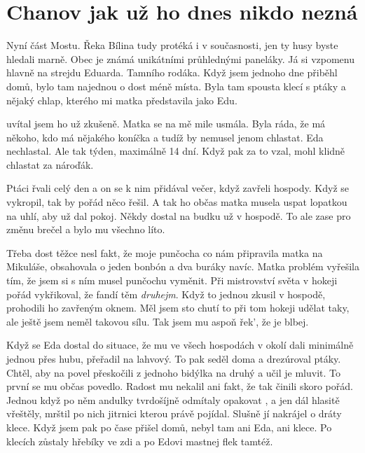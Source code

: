 
\chapter{Chanov jak už ho dnes nikdo nezná}

Nyní část Mostu. Řeka Bílina tudy protéká i v současnosti, jen ty husy byste
hledali marně. Obec je známá unikátními průhlednými paneláky. Já si vzpomenu
hlavně na strejdu Eduarda. Tamního rodáka. Když jsem jednoho dne přiběhl domů,
bylo tam najednou o dost méně místa. Byla tam spousta klecí s ptáky a nějaký
chlap, kterého mi matka představila jako Edu.

 uvítal jsem ho už zkušeně. Matka se na mě mile usmála. Byla
ráda, že má někoho, kdo má nějakého koníčka a tudíž by nemusel jenom chlastat.
Eda nechlastal. Ale tak týden, maximálně 14 dní. Když pak za to vzal, mohl
klidně chlastat za nároďák.

Ptáci řvali celý den a on se k nim přidával večer, když zavřeli hospody. Když
se vykropil, tak by pořád něco řešil. A tak ho občas matka musela uspat
lopatkou na uhlí, aby už dal pokoj. Někdy dostal na budku už v hospodě. To ale
zase pro změnu brečel a bylo mu všechno líto.

Třeba dost těžce nesl fakt, že moje punčocha co nám připravila matka na
Mikuláše, obsahovala o jeden bonbón a dva buráky navíc. Matka problém vyřešila
tím, že jsem si s ním musel punčochu vyměnit. Při mistrovství světa v hokeji
pořád vykřikoval, že fandí těm {\em druhejm}. Když to jednou zkusil v hospodě,
prohodili ho zavřeným oknem. Měl jsem sto chutí to při tom hokeji udělat taky,
ale ještě jsem neměl takovou sílu. Tak jsem mu aspoň řek', že je blbej.

Když se Eda dostal do situace, že mu ve všech hospodách v okolí dali minimálně
jednou přes hubu, přeřadil na lahvový. To pak seděl doma a drezúroval ptáky.
Chtěl, aby na povel přeskočili z jednoho bidýlka na druhý a učil je mluvit. To
první se mu občas povedlo. Radost mu nekalil ani fakt, že tak činili skoro
pořád. Jednou když po něm andulky tvrdošíjně odmítaly opakovat , a
jen dál hlasitě vřeštěly, mrštil po nich jitrnici kterou právě pojídal. Slušně
jí nakrájel o dráty klece. Když jsem pak po čase přišel domů, nebyl tam ani
Eda, ani klece. Po klecích zůstaly hřebíky ve zdi a po Edovi mastnej flek
tamtéž.

